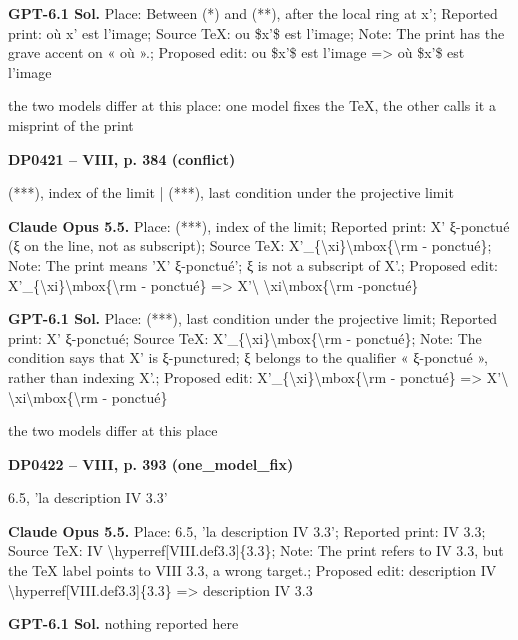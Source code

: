 \textbf{GPT-6.1 Sol.} Place: Between (*) and (**), after the local ring at x'; Reported print: où x' est l'image; Source TeX: ou \$x'\$ est l'image; Note: The print has the grave accent on « où ».; Proposed edit: ou \$x'\$ est l'image =\allowbreak > où \$x'\$ est l'image\par
the two models differ at this place: one model fixes the TeX, the other calls it a misprint of the print\par
\par\noindent\hypertarget{DP0421}{}\textbf{DP0421 -- VIII, p. 384 (conflict)}\par
(***), index of the limit | (***), last condition under the projective limit\par
\textbf{Claude Opus 5.5.} Place: (***), index of the limit; Reported print: X' ξ-ponctué (ξ on the line, not as subscript); Source TeX: X'\_\{\textbackslash{}xi\}\textbackslash{}mbox\{\textbackslash{}rm - ponctué\}; Note: The print means 'X' ξ-ponctué'; ξ is not a subscript of X'.; Proposed edit: X'\_\{\textbackslash{}xi\}\textbackslash{}mbox\{\textbackslash{}rm - ponctué\} =\allowbreak > X'\textbackslash{} \textbackslash{}xi\textbackslash{}mbox\{\textbackslash{}rm -ponctué\}\par
\textbf{GPT-6.1 Sol.} Place: (***), last condition under the projective limit; Reported print: X' ξ-ponctué; Source TeX: X'\_\{\textbackslash{}xi\}\textbackslash{}mbox\{\textbackslash{}rm - ponctué\}; Note: The condition says that X' is ξ-punctured; ξ belongs to the qualifier « ξ-ponctué », rather than indexing X'.; Proposed edit: X'\_\{\textbackslash{}xi\}\textbackslash{}mbox\{\textbackslash{}rm - ponctué\} =\allowbreak > X'\textbackslash{} \textbackslash{}xi\textbackslash{}mbox\{\textbackslash{}rm - ponctué\}\par
the two models differ at this place\par
\par\noindent\hypertarget{DP0422}{}\textbf{DP0422 -- VIII, p. 393 (one\_model\_fix)}\par
6.5, 'la description IV 3.3'\par
\textbf{Claude Opus 5.5.} Place: 6.5, 'la description IV 3.3'; Reported print: IV 3.3; Source TeX: IV \textbackslash{}hyperref[VIII.def3.3]\{3.3\}; Note: The print refers to IV 3.3, but the TeX label points to VIII 3.3, a wrong target.; Proposed edit: description IV \textbackslash{}hyperref[VIII.def3.3]\{3.3\} =\allowbreak > description IV 3.3\par
\textbf{GPT-6.1 Sol.} nothing reported here\par
